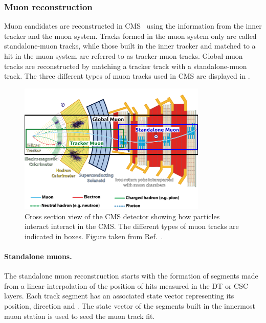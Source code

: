 \subsubsection{Muon reconstruction}\label{sec:MuonReco}

Muon candidates are reconstructed in CMS~\cite{MuonReco} using the information from the inner tracker and the muon system. Tracks formed in the muon system only are called standalone-muon tracks, while those built in the inner tracker and matched to a hit in the muon system are referred to as tracker-muon tracks. Global-muon tracks are reconstructed by matching a tracker track with a standalone-muon track. The three different types of muon tracks used in CMS are displayed in .

\begin{figure}[!htbp]
 \begin{center}
  \includegraphics[width=0.8\textwidth]{Figures/Experiment/CMS/MuonReco.png}
 \end{center}
 \caption{Cross section view of the CMS detector showing how particles interact interact in the CMS. The different types of muon tracks are indicated in boxes. Figure taken from Ref.~\cite{MuonRecoFig}. }
 \label{fig:MuonReco}
\end{figure}

\paragraph{Standalone muons.} The standalone muon reconstruction starts with the formation of segments made from a linear interpolation of the position of hits measured in the DT or CSC layers. Each track segment has an associated state vector representing its position, direction and \pt. The state vector of the segments built in the innermost muon station is used to seed the muon track fit.

